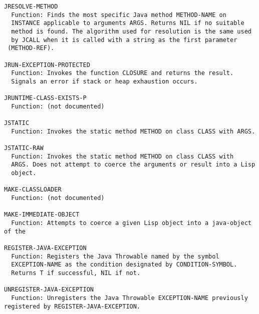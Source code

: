 \begin{verbatim}
JRESOLVE-METHOD
  Function: Finds the most specific Java method METHOD-NAME on
  INSTANCE applicable to arguments ARGS. Returns NIL if no suitable
  method is found. The algorithm used for resolution is the same used
  by JCALL when it is called with a string as the first parameter
 (METHOD-REF).

JRUN-EXCEPTION-PROTECTED
  Function: Invokes the function CLOSURE and returns the result.
  Signals an error if stack or heap exhaustion occurs.

JRUNTIME-CLASS-EXISTS-P
  Function: (not documented)

JSTATIC
  Function: Invokes the static method METHOD on class CLASS with ARGS.

JSTATIC-RAW
  Function: Invokes the static method METHOD on class CLASS with
  ARGS. Does not attempt to coerce the arguments or result into a Lisp
  object.

MAKE-CLASSLOADER
  Function: (not documented)

MAKE-IMMEDIATE-OBJECT
  Function: Attempts to coerce a given Lisp object into a java-object of the

REGISTER-JAVA-EXCEPTION
  Function: Registers the Java Throwable named by the symbol
  EXCEPTION-NAME as the condition designated by CONDITION-SYMBOL.
  Returns T if successful, NIL if not.

UNREGISTER-JAVA-EXCEPTION
  Function: Unregisters the Java Throwable EXCEPTION-NAME previously registered by REGISTER-JAVA-EXCEPTION.

\end{verbatim}
